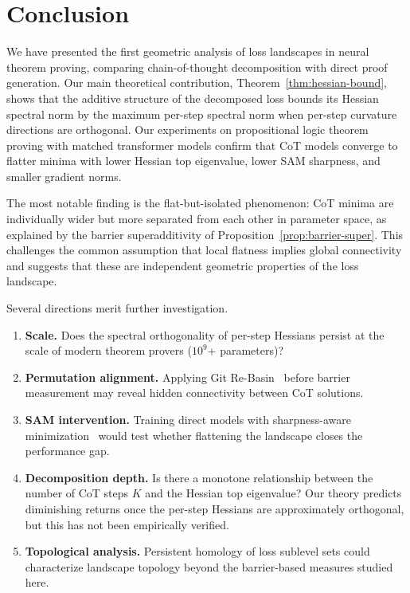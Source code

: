 \section{Conclusion}\label{sec:conclusion}

We have presented the first geometric analysis of loss landscapes in neural
theorem proving, comparing chain-of-thought decomposition with direct proof
generation. Our main theoretical contribution,
Theorem~\ref{thm:hessian-bound}, shows that the additive structure of the
decomposed loss bounds its Hessian spectral norm by the maximum per-step
spectral norm when per-step curvature directions are orthogonal. Our
experiments on propositional logic theorem proving with matched transformer
models confirm that CoT models converge to flatter minima with lower Hessian
top eigenvalue, lower SAM sharpness, and smaller gradient norms.

The most notable finding is the flat-but-isolated phenomenon: CoT minima are
individually wider but more separated from each other in parameter space, as
explained by the barrier superadditivity of
Proposition~\ref{prop:barrier-super}. This challenges the common assumption
that local flatness implies global connectivity and suggests that these are
independent geometric properties of the loss landscape.

Several directions merit further investigation.

\begin{enumerate}[leftmargin=*,itemsep=2pt]
\item \textbf{Scale.} Does the spectral orthogonality of per-step Hessians
  persist at the scale of modern theorem provers ($10^9$+ parameters)?

\item \textbf{Permutation alignment.} Applying Git
  Re-Basin~\cite{ainsworth2023git} before barrier measurement may reveal
  hidden connectivity between CoT solutions.

\item \textbf{SAM intervention.} Training direct models with
  sharpness-aware minimization~\cite{foret2021sharpness} would test whether
  flattening the landscape closes the performance gap.

\item \textbf{Decomposition depth.} Is there a monotone relationship between
  the number of CoT steps $K$ and the Hessian top eigenvalue? Our theory
  predicts diminishing returns once the per-step Hessians are approximately
  orthogonal, but this has not been empirically verified.

\item \textbf{Topological analysis.} Persistent homology of loss sublevel
  sets could characterize landscape topology beyond the barrier-based measures
  studied here.
\end{enumerate}


